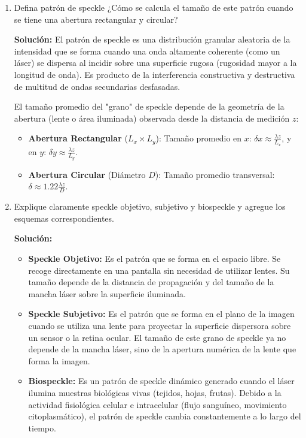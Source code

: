 \documentclass[12pt, letterpaper]{article}
\begin{document}
\begin{enumerate}
		\item Defina patrón de speckle ¿Cómo se calcula el tamaño de este patrón cuando se tiene una abertura rectangular y circular? 
		
		\textbf{Solución:}
		El patrón de speckle es una distribución granular aleatoria de la intensidad que se forma cuando una onda altamente coherente (como un láser) se dispersa al incidir sobre una superficie rugosa (rugosidad mayor a la longitud de onda). Es producto de la interferencia constructiva y destructiva de multitud de ondas secundarias desfasadas.
		
		El tamaño promedio del "grano" de speckle depende de la geometría de la abertura (lente o área iluminada) observada desde la distancia de medición $z$:
		\begin{itemize}
			\item \textbf{Abertura Rectangular} ($L_x \times L_y$):
			Tamaño promedio en $x$: $\delta x \approx \frac{\lambda z}{L_x}$, y en $y$: $\delta y \approx \frac{\lambda z}{L_y}$.
			\item \textbf{Abertura Circular} (Diámetro $D$):
			Tamaño promedio transversal: $\delta \approx 1.22 \frac{\lambda z}{D}$.
		\end{itemize}
		
		\item Explique claramente speckle objetivo, subjetivo y biospeckle y agregue los esquemas correspondientes.
		
		\textbf{Solución:}
		\begin{itemize}
			\item \textbf{Speckle Objetivo:} Es el patrón que se forma en el espacio libre. Se recoge directamente en una pantalla sin necesidad de utilizar lentes. Su tamaño depende de la distancia de propagación y del tamaño de la mancha láser sobre la superficie iluminada.
			\item \textbf{Speckle Subjetivo:} Es el patrón que se forma en el plano de la imagen cuando se utiliza una lente para proyectar la superficie dispersora sobre un sensor o la retina ocular. El tamaño de este grano de speckle ya no depende de la mancha láser, sino de la apertura numérica de la lente que forma la imagen.
			\item \textbf{Biospeckle:} Es un patrón de speckle dinámico generado cuando el láser ilumina muestras biológicas vivas (tejidos, hojas, frutas). Debido a la actividad fisiológica celular e intracelular (flujo sanguíneo, movimiento citoplasmático), el patrón de speckle cambia constantemente a lo largo del tiempo.
		\end{itemize}
		

\end{enumerate}
\end{document}
